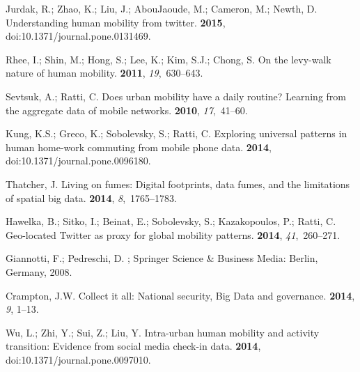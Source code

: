 \documentclass[ijgi,article,accept,moreauthors,pdftex,10pt,a4paper]{mdpi}
\theoremstyle{mdpi}
\newcounter{ex}
\newcounter{re}
\theoremstyle{mdpidefinition}
\begin{document}
\begin{thebibliography}{-------}
Jurdak, R.; Zhao, K.; Liu, J.; AbouJaoude, M.; Cameron, M.; Newth, D.
\newblock Understanding human mobility from twitter.
 {\bf 2015}, doi:10.1371/journal.pone.0131469.

Rhee, I.; Shin, M.; Hong, S.; Lee, K.; Kim, S.J.; Chong, S.
\newblock On the levy-walk nature of human mobility.
 {\bf 2011}, {\em
  19},~630--643.

Sevtsuk, A.; Ratti, C.
\newblock Does urban mobility have a daily routine? Learning from the aggregate
  data of mobile networks.
 {\bf 2010}, {\em 17},~41--60.

Kung, K.S.; Greco, K.; Sobolevsky, S.; Ratti, C.
\newblock Exploring universal patterns in human home-work commuting from mobile
  phone data.
 {\bf 2014}, doi:10.1371/journal.pone.0096180.


Thatcher, J.
\newblock Living on fumes: Digital footprints, data fumes, and the limitations
  of spatial big data.
 {\bf 2014}, {\em
  8},~1765--1783.


Hawelka, B.; Sitko, I.; Beinat, E.; Sobolevsky, S.; Kazakopoulos, P.; Ratti, C.
\newblock Geo-located Twitter as proxy for global mobility patterns.
 {\bf 2014}, {\em
  41},~260--271.

Giannotti, F.; Pedreschi, D.
; Springer Science \& Business Media: Berlin, Germany,  2008.

Crampton, J.W.
\newblock Collect it all: National security, Big Data and governance.
 {\bf 2014}, {\em 9}, 1--13.


Wu, L.; Zhi, Y.; Sui, Z.; Liu, Y.
\newblock Intra-urban human mobility and activity transition: Evidence from
  social media check-in data.
 {\bf 2014}, doi:10.1371/journal.pone.0097010.


\end{thebibliography}
\end{document}
